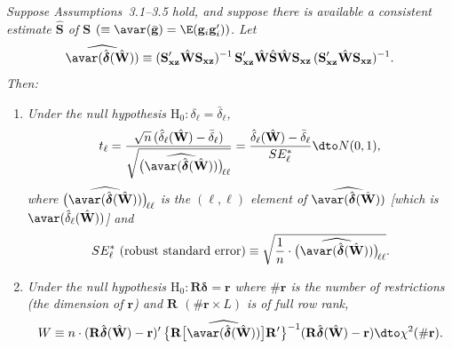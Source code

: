 \begin{proposition}
\label{prop:3.3}
\emph{Suppose Assumptions~3.1--3.5 hold, and suppose there is available a consistent estimate
$\hat{\mathbf{S}}$ of $\mathbf{S}$ $(\equiv \avar(\bar{\mathbf{g}}) = \E(\mathbf{g}_i \mathbf{g}_i'))$.
Let}
\[
  \widehat{\avar(\hat{\boldsymbol{\delta}}(\hat{\mathbf{W}}))}
  \equiv (\mathbf{S}_{\mathbf{xz}}' \hat{\mathbf{W}} \mathbf{S}_{\mathbf{xz}})^{-1}\,
    \mathbf{S}_{\mathbf{xz}}' \hat{\mathbf{W}} \hat{\mathbf{S}} \hat{\mathbf{W}}
    \mathbf{S}_{\mathbf{xz}}\,
    (\mathbf{S}_{\mathbf{xz}}' \hat{\mathbf{W}} \mathbf{S}_{\mathbf{xz}})^{-1}.
\]
\emph{Then:}
\begin{enumerate}[label=(\alph*)]
\item \emph{Under the null hypothesis $\mathrm{H}_0\colon \delta_\ell = \bar{\delta}_\ell$,}
  \[
    t_\ell
    = \frac{\sqrt{n}\,(\hat{\delta}_\ell(\hat{\mathbf{W}}) - \bar{\delta}_\ell)}
           {\sqrt{\bigl(\widehat{\avar(\hat{\boldsymbol{\delta}}(\hat{\mathbf{W}}))}\bigr)_{\!\ell\ell}}}
    = \frac{\hat{\delta}_\ell(\hat{\mathbf{W}}) - \bar{\delta}_\ell}{SE_\ell^*}
    \dto N(0,1),
  \]
  \emph{where
  $\bigl(\widehat{\avar(\hat{\boldsymbol{\delta}}(\hat{\mathbf{W}}))}\bigr)_{\!\ell\ell}$
  is the $(\ell,\ell)$ element of
  $\widehat{\avar(\hat{\boldsymbol{\delta}}(\hat{\mathbf{W}}))}$
  [which is $\avar(\hat{\delta}_\ell(\hat{\mathbf{W}}))$] and}
  \begin{equation}
    SE_\ell^* \text{ (robust standard error)}
    \equiv \sqrt{\frac{1}{n} \cdot
      \bigl(\widehat{\avar(\hat{\boldsymbol{\delta}}(\hat{\mathbf{W}}))}\bigr)_{\!\ell\ell}}.
    \label{eq:3.5.7}
  \end{equation}

\item \emph{Under the null hypothesis $\mathrm{H}_0\colon
  \mathbf{R}\boldsymbol{\delta} = \mathbf{r}$ where $\#\mathbf{r}$ is the number of restrictions
  (the dimension of $\mathbf{r}$) and $\mathbf{R}$ $(\#\mathbf{r} \times L)$ is of full row rank,}
  \begin{equation}
    W \equiv n \cdot (\mathbf{R}\hat{\boldsymbol{\delta}}(\hat{\mathbf{W}}) - \mathbf{r})'\,
    \bigl\{\mathbf{R}\bigl[\widehat{\avar(\hat{\boldsymbol{\delta}}(\hat{\mathbf{W}}))}\bigr]
    \mathbf{R}'\bigr\}^{-1}
    (\mathbf{R}\hat{\boldsymbol{\delta}}(\hat{\mathbf{W}}) - \mathbf{r})
    \dto \chi^2(\#\mathbf{r}).
    \label{eq:3.5.8}
  \end{equation}


\end{enumerate}
\end{proposition}
